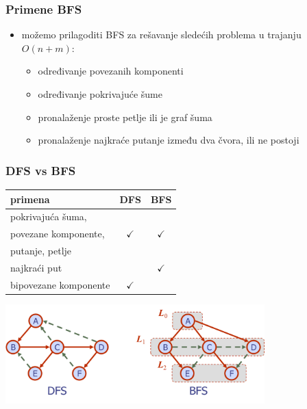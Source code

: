 \documentclass[compress]{beamer}
\begin{document}
\begin{frame}[fragile]
  \frametitle{Primene BFS}
  \begin{itemize}
    \item možemo prilagoditi BFS za rešavanje sledećih problema u 
      trajanju $O(n+m)$:
    \begin{itemize}
      \item određivanje povezanih komponenti
      \item određivanje pokrivajuće šume
      \item pronalaženje proste petlje ili je graf šuma
      \item pronalaženje najkraće putanje između dva čvora, ili ne 
        postoji
    \end{itemize}
  \end{itemize}
\end{frame}

\begin{frame}[fragile]
  \frametitle{DFS vs BFS}
  \begin{center}
    \begin{tabular}{l|c|c}
      \textbf{primena} & \textbf{DFS} & \textbf{BFS} \\ \hline
      pokrivajuća šuma, &  &  \\
      povezane komponente, & $\checkmark$ & $\checkmark$ \\
      putanje, petlje &  &  \\ \hline
      najkraći put &  & $\checkmark$ \\ \hline
      bipovezane komponente & $\checkmark$ & \\
    \end{tabular}
    \includegraphics[width=10cm]{asp-14-pic26.png}
  \end{center}
\end{frame}
\end{document}
